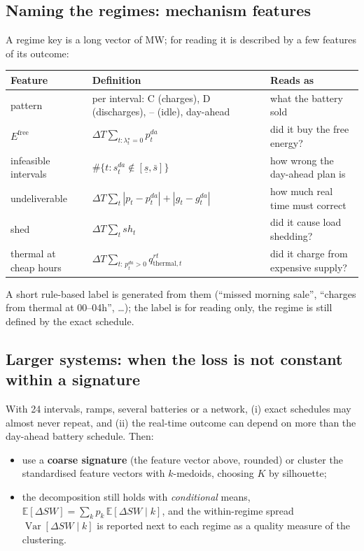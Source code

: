 \documentclass[10pt,a4paper]{article}
\newcommand{\lamstar}{\lambda^{\star}}
\newcommand{\E}{\mathbb E}
\begin{document}
\subsection{Naming the regimes: mechanism features}
A regime key is a long vector of MW; for reading it is described by a few features of its outcome:
\begin{center}\footnotesize
\begin{tabular}{@{}lll@{}}
\toprule
Feature & Definition & Reads as \\
\midrule
pattern & per interval: C (charges), D (discharges), -- (idle), day-ahead & what the battery sold \\
$E^{\text{free}}$ & $\Delta T\sum_{t:\lamstar_t=0}p^{da}_t$ & did it buy the free energy? \\
infeasible intervals & $\#\{t: s^{da}_t\notin[\underline s,\bar s]\}$ & how wrong the day-ahead plan is \\
undeliverable & $\Delta T\sum_t|p_t-p^{da}_t|+|g_t-g^{da}_t|$ & how much real time must correct \\
shed & $\Delta T\sum_t sh_t$ & did it cause load shedding? \\
thermal at cheap hours & $\Delta T\sum_{t:\,p^{da}_t>0}q^{rt}_{\text{thermal},t}$ & did it charge from expensive supply? \\
\bottomrule
\end{tabular}
\end{center}
A short rule-based label is generated from them (``missed morning sale'', ``charges from thermal at
00--04h'', \dots); the label is for reading only, the regime is still defined by the exact schedule.

\subsection{Larger systems: when the loss is not constant within a signature}
With 24 intervals, ramps, several batteries or a network, (i) exact schedules may almost never repeat, and
(ii) the real-time outcome can depend on more than the day-ahead battery schedule. Then:
\begin{itemize}
  \item use a \textbf{coarse signature} (the feature vector above, rounded) or cluster the standardised
    feature vectors with $k$-medoids, choosing $K$ by silhouette;
  \item the decomposition still holds with \emph{conditional} means,
    $\E[\Delta SW]=\sum_kp_k\,\E[\Delta SW\mid k]$, and the within-regime spread
    $\operatorname{Var}[\Delta SW\mid k]$ is reported next to each regime as a quality measure of the clustering.
\end{itemize}
\end{document}
